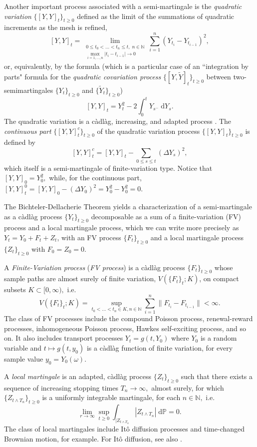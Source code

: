 \documentclass[reqno,12pt]{amsart}
\theoremstyle{plain} %
\theoremstyle{definition} %
\begin{document}
Another important process associated with a semi-martingale is the \emph{quadratic variation} $\{[Y, Y]_t\}_{t\geq 0}$ defined as the limit of the summations of quadratic increments as the mesh is refined,
\[
    [Y, Y]_t = \lim_{\substack{0\leq t_0 < \ldots < t_n \leq t, \;n\in \mathbb{N} \\ \max_{i=1, \ldots, n}|t_i - t_{i-1}| \rightarrow 0}} \sum_{i=1}^n (Y_{t_i} - Y_{t_{i-1}})^2,
\]
or, equivalently, by the formula (which is a particular case of an ``integration by parts" formula for the \emph{quadratic covariation process} $\{[Y, \tilde Y]_t\}_{t\geq 0}$ between two-semimartingales $\{Y_t\}_{t\geq 0}$ and $\{\tilde Y_t\}_{t\geq 0}$)
\[
    [Y, Y]_t = Y_t^2 - 2\int_0^t Y_{s^-} \;\mathrm{d}Y_s.
\]
The quadratic variation is a c\`adl\`ag, increasing, and adapted process \cite[Theorem II.22]{Protter2005}. The \emph{continuous part} $\{[Y, Y]_t^c\}_{t\geq 0}$ of the quadratic variation process $\{[Y, Y]_t\}_{t\geq 0}$ is defined by
\[
    [Y, Y]_t^c = [Y, Y]_t - \sum_{0\leq s \leq t} \left(\Delta Y_s\right)^2,
\]
which itself is a semi-martingale of finite-variation type. Notice that $[Y, Y]_0 = Y_0^2,$ while, for the continuous part, $[Y, Y]_t^0 = [Y, Y]_0 - \left(\Delta Y_0\right)^2 = Y_0^2 - Y_0^2 = 0.$

The Bichteler-Dellacherie Theorem \cite[Theorem III.47]{Protter2005} yields a characterization of a semi-martingale as a c\`adl\`ag process $\{Y_t\}_{t\geq 0}$ decomposable as a sum of a finite-variation (FV) process and a local martingale process, which we can write more precisely as $Y_t = Y_0 + F_t + Z_t$, with an FV process $\{F_t\}_{t\geq 0}$ and a local martingale process $\{Z_t\}_{t\geq 0}$ with $F_0 = Z_0 = 0.$

A \emph{Finite-Variation process} (\emph{FV process}) is a c\`adl\`ag process $\{F_t\}_{t \geq 0}$ whose sample paths are almost surely of finite variation, $V(\{F_t\}_t; K)$, on compact subsets $K\subset [0, \infty),$ i.e.
\[ V(\{F_t\}_t; K) = \sup_{t_0 < \ldots < t_n \in K, n\in \mathbb{N}} \sum_{i=1}^n \|F_{t_i} - F_{t_{i-1}}\| < \infty.
\]
The class of FV processes include the compound Poisson process, renewal-reward processes, inhomogeneous Poisson process, Hawkes self-exciting process, and so on. It also includes transport processes $Y_t = g(t, Y_0)$ where $Y_0$ is a random variable and $t \mapsto g(t, y_0)$ is a c\`adl\`ag function of finite variation, for every sample value $y_0=Y_0(\omega)$.

A \emph{local martingale} is an adapted, c\`adl\`ag process $\{Z_t\}_{t\geq 0}$ such that there exists a sequence of increasing stopping times $T_n \rightarrow \infty,$ almost surely, for which $\{Z_{t \wedge T_n}\}_{t \geq 0}$ is a uniformly integrable martingale, for each $n\in\mathbb{N},$ i.e.
\[
    \lim_{r\rightarrow \infty} \sup_{t \geq 0} \int_{|Z_{t\wedge T_n}}|Z_{t\wedge T_n}|\;\mathrm{d}\mathbb{P} = 0.
\]
The class of local martingales include It\^o diffusion processes and time-changed Brownian motion, for example. For It\^o diffusion, see also \cite{Oksendal2003}.
\end{document}
